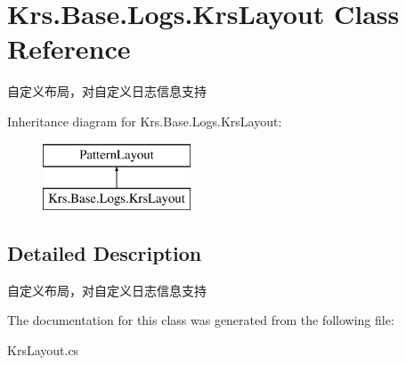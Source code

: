 \hypertarget{class_krs_1_1_base_1_1_logs_1_1_krs_layout}{\section{Krs.\-Base.\-Logs.\-Krs\-Layout Class Reference}
\label{class_krs_1_1_base_1_1_logs_1_1_krs_layout}
}


自定义布局，对自定义日志信息支持  


Inheritance diagram for Krs.\-Base.\-Logs.\-Krs\-Layout\-:\begin{figure}[H]
\begin{center}
\leavevmode
\includegraphics[height=2.000000cm]{class_krs_1_1_base_1_1_logs_1_1_krs_layout}
\end{center}
\end{figure}


\subsection{Detailed Description}
自定义布局，对自定义日志信息支持 



The documentation for this class was generated from the following file\-:\begin{DoxyCompactItemize}
\item 
Krs\-Layout.\-cs\end{DoxyCompactItemize}
